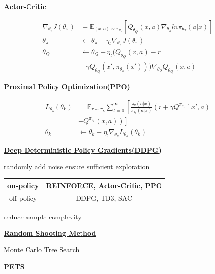 \documentclass[landscape,a0paper,fontscale=0.285]{baposter} %
\begin{document}
\begin{poster}
{\underline{\textbf{Actor-Critic}}

$$
\begin{aligned}
\nabla_{\theta_\pi} J(\theta_\pi) &= \mathbb E_{(x,a)\sim \pi_{\theta_\pi}} 
[Q_{\theta_Q}(x,a)\nabla_{\theta_\pi}ln\pi_{\theta_\pi}(a|x)]
\\
\theta_\pi &\leftarrow \theta_\pi + \eta_t \nabla_{\theta_\pi}J(\theta_\pi)
\\
\theta_Q &\leftarrow \theta_Q - \eta_t(Q_{\theta_Q}(x,a) - r \\
&- \gamma Q_{\theta_Q}(x',\pi_{\theta_\pi}(x')))\nabla_{\theta_Q}Q_{\theta_Q}(x,a)
\end{aligned}
$$

\underline{\textbf{Proximal Policy Optimization(PPO)}}

$$
\begin{aligned}
L_{\theta_k}(\theta_k) &= \mathbb E_{\tau \sim \pi_k}\sum_{t=0}^\infty \left[\frac{\pi_\theta(a|x)}{\pi_{\theta_k}(a|x)}\left(r + \gamma Q^{\pi_{\theta_k}}(x',a)\right.\right.\\
&\left.\left.-Q^{\pi_{\theta_k}}(x,a)\right)\right]
\\
\theta_k &\leftarrow \theta_k - \eta_t \nabla_{\theta_k}L_{
\theta_k}(\theta_k)
\end{aligned}
$$

\underline{\textbf{Deep Deterministic Policy Gradients(DDPG)}}

randomly add noise ensure sufficient  exploration

\begin{tabular}{|c|c|}
    \hline
     on-policy &  REINFORCE, Actor-Critic, PPO \\
     \hline
     off-policy&  DDPG, TD3, SAC\\
     \hline
\end{tabular}

\colorbox[HTML]{CCFFFF}{}

reduce sample complexity

\underline{\textbf{Random Shooting Method}}

Monte Carlo Tree Search

\underline{\textbf{PETS}}

}
\end{poster}
\end{document}

